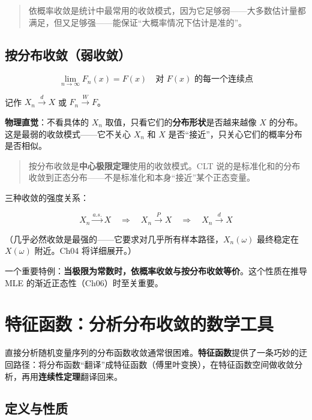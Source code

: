 \documentclass[
]{book}
\begin{document}
\begin{quote}
依概率收敛是统计中最常用的收敛模式，因为它足够弱------大多数估计量都满足，但又足够强------能保证``大概率情况下估计是准的''。
\end{quote}

\subsection{按分布收敛（弱收敛）}\label{ux6309ux5206ux5e03ux6536ux655bux5f31ux6536ux655b}

\[\lim_{n \to \infty} F_n(x) = F(x) \quad \text{对 } F(x) \text{ 的每一个连续点}\]

记作 \(X_n \xrightarrow{d} X\) 或 \(F_n \xrightarrow{W} F\)。

\textbf{物理直觉}：不看具体的 \(X_n\) 取值，只看它们的\textbf{分布形状}是否越来越像 \(X\) 的分布。这是最弱的收敛模式------它不关心 \(X_n\) 和 \(X\) 是否``接近''，只关心它们的概率分布是否相似。

\begin{quote}
按分布收敛是\textbf{中心极限定理}使用的收敛模式。CLT 说的是标准化和的分布收敛到正态分布------不是标准化和本身``接近''某个正态变量。
\end{quote}

三种收敛的强度关系：

\[X_n \xrightarrow{a.s.} X \quad \Rightarrow \quad X_n \xrightarrow{P} X \quad \Rightarrow \quad X_n \xrightarrow{d} X\]

（几乎必然收敛是最强的------它要求对几乎所有样本路径，\(X_n(\omega)\) 最终稳定在 \(X(\omega)\) 附近。Ch04 将详细展开。）

一个重要特例：\textbf{当极限为常数时，依概率收敛与按分布收敛等价}。这个性质在推导 MLE 的渐近正态性（Ch06）时至关重要。

\section{特征函数：分析分布收敛的数学工具}\label{ux7279ux5f81ux51fdux6570ux5206ux6790ux5206ux5e03ux6536ux655bux7684ux6570ux5b66ux5de5ux5177}

直接分析随机变量序列的分布函数收敛通常很困难。\textbf{特征函数}提供了一条巧妙的迂回路径：将分布函数``翻译''成特征函数（傅里叶变换），在特征函数空间做收敛分析，再用\textbf{连续性定理}翻译回来。

\subsection{定义与性质}\label{ux5b9aux4e49ux4e0eux6027ux8d28}
\end{document}
